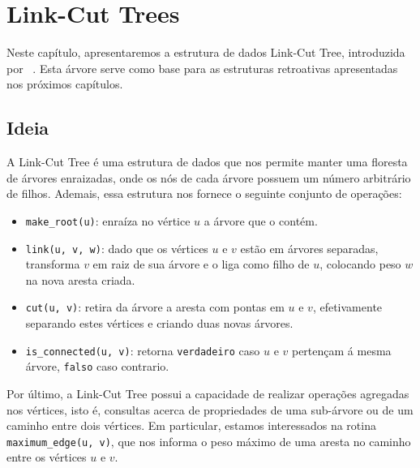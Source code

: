 
\chapter{Link-Cut Trees}
\label{cap:link-cut-trees}

Neste capítulo, apresentaremos a estrutura de dados Link-Cut Tree, introduzida por ~\citet{10.1145/800076.802464}. Esta árvore serve como base para as estruturas retroativas apresentadas nos próximos capítulos.

\section{Ideia}
\label{sec:lct-ideia}

A Link-Cut Tree é uma estrutura de dados que nos permite manter uma floresta de árvores enraizadas, onde os nós de cada árvore possuem um número arbitrário de filhos. Ademais, essa estrutura nos fornece o seguinte conjunto de operações:

\begin{itemize}
    \item \texttt{make\_root(u)}: enraíza no vértice $u$ a árvore que o contém.
    \item \texttt{link(u, v, w)}: dado que os vértices $u$ e $v$ estão em árvores separadas, transforma $v$ em raiz de sua árvore e o liga como filho de $u$, colocando peso $w$ na nova aresta criada.
    \item \texttt{cut(u, v)}: retira da árvore a aresta com pontas em $u$ e $v$, efetivamente separando estes vértices e criando duas novas árvores.
    \item \texttt{is\_connected(u, v)}: retorna \texttt{verdadeiro} caso $u$ e $v$ pertençam á mesma árvore, \texttt{falso} caso contrario.
\end{itemize}

Por último, a Link-Cut Tree possui a capacidade de realizar operações agregadas nos vértices, isto é, consultas acerca de propriedades de uma sub-árvore ou de um caminho entre dois vértices. Em particular, estamos interessados na rotina \texttt{maximum\_edge(u, v)}, que nos informa o peso máximo de uma aresta no caminho entre os vértices $u$ e $v$.

